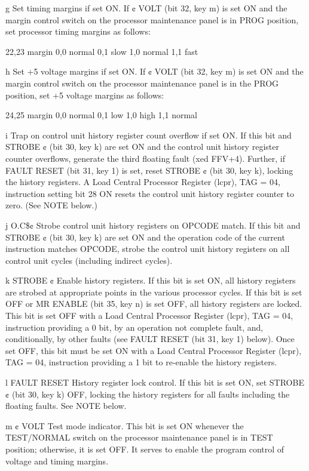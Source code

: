 g Set timing margins if set ON. If ¢ VOLT (bit 32, key m) is set ON and the
margin control switch on the processor maintenance panel is in PROG position,
set processor timing margins as follows:

22,23 margin
0,0 normal
0,1 slow
1,0 normal
1,1 fast

h Set +5 voltage margins if set ON. If ¢ VOLT (bit 32, key m) is set ON and the
margin control switch on the processor maintenance panel is in the PROG
position, set +5 voltage margins as follows:

24,25 margin
0,0 normal
0,1 low
1,0 high
1,1 normal

i Trap on control unit history register count overflow if set ON. If this bit
and STROBE ¢ (bit 30, key k) are set ON and the control unit history register
counter overflows, generate the third floating fault (xed FFV+4). Further, if
FAULT RESET (bit 31, key 1) is set, reset STROBE ¢ (bit 30, key k), locking the
history registers. A Load Central Processor Register (lcpr), TAG = 04,
instruction setting bit 28 ON resets the control unit history register counter
to zero. (See NOTE below.)

j O.C\$¢ Strobe control unit history registers on OPCODE match. If this bit and
STROBE ¢ (bit 30, key k) are set ON and the operation code of the current
instruction matches OPCODE, strobe the control unit history registers on all
control unit cycles (including indirect cycles).

k STROBE ¢ Enable history registers. If this bit is set ON, all history
registers are strobed at appropriate points in the various processor cycles. If
this bit is set OFF or MR ENABLE (bit 35, key n) is set OFF, all history
registers are locked. This bit is set OFF with a Load Central Processor
Register (lcpr), TAG = 04, instruction providing a 0 bit, by an operation not
complete fault, and, conditionally, by other faults (see FAULT RESET (bit 31,
key 1) below). Once set OFF, this bit must be set ON with a Load Central
Processor Register (lcpr), TAG = 04, instruction providing a 1 bit to re-enable
the history registers.

l FAULT RESET History register lock control. If this bit is set ON, set STROBE
¢ (bit 30, key k) OFF, locking the history registers for all faults including
the floating faults. See NOTE below.

m ¢ VOLT Test mode indicator. This bit is set ON whenever the TEST/NORMAL
switch on the processor maintenance panel is in TEST position; otherwise, it is
set OFF. It serves to enable the program control of voltage and timing margins.

